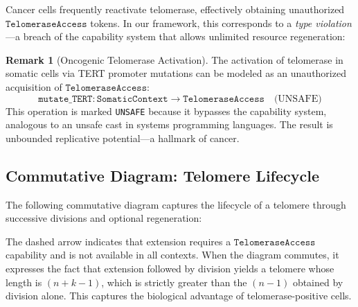 \documentclass[12pt,a4paper]{article}
\theoremstyle{plain}
\theoremstyle{definition}
\newtheorem{remark}[theorem]{Remark}
\begin{document}
Cancer cells frequently reactivate telomerase, effectively obtaining unauthorized $\texttt{TelomeraseAccess}$ tokens. In our framework, this corresponds to a \emph{type violation}---a breach of the capability system that allows unlimited resource regeneration:

\begin{remark}[Oncogenic Telomerase Activation]
The activation of telomerase in somatic cells via TERT promoter mutations can be modeled as an unauthorized acquisition of $\texttt{TelomeraseAccess}$:
\[
  \texttt{mutate\_TERT} : \texttt{SomaticContext} \to \texttt{TelomeraseAccess} \quad \text{(UNSAFE)}
\]
This operation is marked \texttt{UNSAFE} because it bypasses the capability system, analogous to an unsafe cast in systems programming languages. The result is unbounded replicative potential---a hallmark of cancer.
\end{remark}

\subsection{Commutative Diagram: Telomere Lifecycle}

The following commutative diagram captures the lifecycle of a telomere through successive divisions and optional regeneration:

\begin{center}
\end{center}

The dashed arrow indicates that extension requires a $\texttt{TelomeraseAccess}$ capability and is not available in all contexts. When the diagram commutes, it expresses the fact that extension followed by division yields a telomere whose length is $(n+k-1)$, which is strictly greater than the $(n-1)$ obtained by division alone. This captures the biological advantage of telomerase-positive cells.


\end{document}
